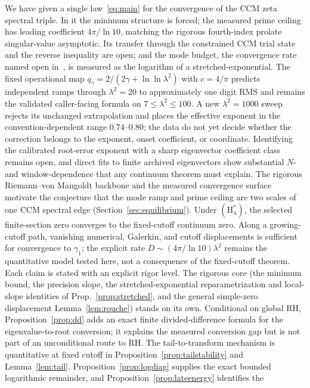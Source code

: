 \documentclass[11pt,a4paper]{article}
\begin{document}
We have given a single law~\eqref{eq:main} for the convergence of the CCM
zeta spectral triple. In it the minimum structure is forced; the measured prime
ceiling has leading coefficient $4\pi/\ln10$, matching the rigorous
fourth-index prolate singular-value asymptotic. Its transfer through the
constrained CCM trial state and the reverse inequality are open; and the mode budget, the convergence rate
named open in~\cite{CCM2025}, is measured as the logarithm of a
stretched-exponential. The fixed operational map
$q_\gamma=2/(2\gamma+\ln\ln\lambda^2)$ with $c=4/\pi$ predicts independent
ramps through $\lambda^2=20$ to approximately one digit RMS and remains the
validated caller-facing formula on $7\le\lambda^2\le100$. A new
$\lambda^2=1000$ sweep rejects its unchanged extrapolation and places the
effective exponent in the convention-dependent range $0.74$--$0.80$; the data
do not yet decide whether the correction belongs to the exponent, onset
coefficient, or coordinate. Identifying the calibrated root-error exponent
with a sharp eigenvector coefficient class remains open, and direct fits to
finite archived eigenvectors show substantial $N$- and window-dependence that
any continuum theorem must explain.
The rigorous Riemann--von Mangoldt backbone
and the measured convergence surface motivate the conjecture that the mode ramp
and prime ceiling are two scales of one CCM spectral edge
(Section~\ref{sec:equilibrium}). Under $(\mathrm{H}_\lambda^\ast)$,
the selected finite-section zero converges to the fixed-cutoff continuum zero.
Along a growing-cutoff path, vanishing numerical, Galerkin, and cutoff
displacements is sufficient for convergence to $\gamma_1$; the explicit rate
$D\sim(4\pi/\ln10)\lambda^2$ remains the quantitative model tested here, not a
consequence of the fixed-cutoff theorem. Each claim is stated with an explicit rigor
level. The rigorous core (the minimum bound, the precision slope, the
stretched-exponential reparametrization and local-slope identities of
Prop.~\ref{prop:stretched}, and the general simple-zero displacement
Lemma~\ref{lem:rouche}) stands on its own. Conditional on global RH,
Proposition~\ref{prop:dd} adds an exact finite divided-difference formula for
the eigenvalue-to-root conversion; it explains the measured conversion gap but
is not part of an unconditional route to RH. The tail-to-transform mechanism is
quantitative at fixed cutoff in Proposition~\ref{prop:tailstability} and
Lemma~\ref{lem:tail}. Proposition~\ref{prop:logdiag} supplies the exact bounded
logarithmic remainder, and Proposition~\ref{prop:lateenergy} identifies the
\end{document}
